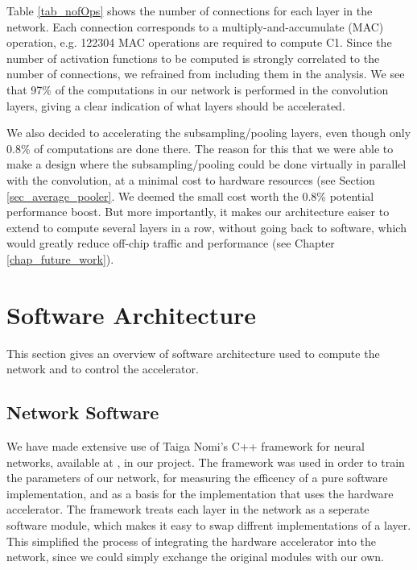 Table \ref{tab_nofOps} shows the number of connections for each layer in the network. Each connection corresponds to a multiply-and-accumulate (MAC) operation, e.g. 122304 MAC operations are required to compute C1. Since the number of activation functions to be computed is strongly correlated to the number of connections, we refrained from including them in the analysis. 
We see that 97\% of the computations in our network is performed in the convolution layers, giving a clear indication of what layers should be accelerated. 

We also decided to accelerating the subsampling/pooling layers, even though only 0.8\% of computations are done there. The reason for this that we were able to make a design where the subsampling/pooling could be done virtually in parallel with the convolution, at a minimal cost to hardware resources (see Section \ref{sec_average_pooler}. We deemed the small cost worth the 0.8\% potential performance boost. But more importantly, it makes our architecture eaiser to extend to compute several layers in a row, without going back to software, which would greatly reduce off-chip traffic and performance (see Chapter \ref{chap_future_work}).


\section{Software Architecture}

This section gives an overview of software architecture used to compute the network and to control the accelerator.

\subsection{Network Software}

We have made extensive use of Taiga Nomi's C++ framework for neural networks, available at \cite{SoftwareGithub}, in our project. The framework was used in order to train the parameters of our network, for measuring the efficency of a pure software implementation, and as a basis for the implementation that uses the hardware accelerator. The framework treats each layer in the network as a seperate software module, which makes it easy to swap diffrent implementations of a layer. This simplified the process of integrating the hardware accelerator into the network, since we could simply exchange the original modules with our own.

